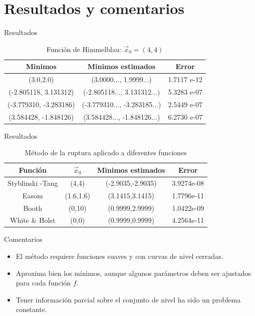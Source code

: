 \documentclass[fleqn]{beamer}\usepackage[]{graphicx}\usepackage[]{xcolor}
\begin{document}
\section{Resultados y comentarios}
\begin{frame}{Resultados}
    \begin{table}[h]
    \centering
    \caption{Función de Himmelblau: $\vec{x}_0 = (4,4)$}
    \begin{tabular}{|c|c|c|}\hline 
    Minimos & Minimos estimados & Error  \\
    \hline
    (3.0,2.0) & (3.0000..., 1.9999...) & 1.7117 e-12\\
    (-2.805118, 3.131312) & (-2.805118..., 3.131312...) & 5.3283 e-07\\
    (-3.779310, -3.283186) & (-3.779310..., -3.283185...) &  2.5449 e-07\\
    (3.584428, -1.848126) & (3.584428..., -1.848126...) & 6.2730 e-07\\
    \hline 
    \end{tabular}
    \label{tab:HimMinima}
\end{table}
\end{frame}

\begin{frame}{Resultados}
\begin{table}[h]
    \centering
    \caption{Método de la ruptura aplicado a diferentes funciones}
    \begin{tabular}{|c|c|c|c|}\hline
    Función & $\vec{x}_0$ & Minimos estimados & Error \\
    \hline 
    Styblinski -Tang    & (4,4) &(-2.9035,-2.9035) & 3.9274e-08\\
    Easom  &  (1.6,1.6) &(3.1415,3.1415) & 1.7796e-11\\
    Booth  & (0,10) &(0.9999,2.9999) & 1.0422e-09\\
    White \& Holst     & (0,0) &(0.9999,0.9999) & 4.2564e-11\\
    \hline
    \end{tabular}
    \label{tab:Various}
\end{table}
\end{frame}


\begin{frame}{Comentarios}
    \begin{itemize}[<+->]
        \item El método requiere funciones suaves y con curvas de nivel cerradas.
        \item Aproxima bien los mínimos, aunque algunos parámetros deben ser ajustados para cada función $f$.
        \item Tener información parcial sobre el conjunto de nivel ha sido un problema constante.
    \end{itemize}
\end{frame}
\end{document}
